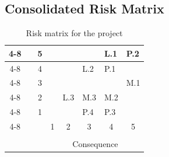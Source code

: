 
%


%
\large
\subsection{Consolidated Risk Matrix}
\begin{table}[H]
    \centering
    \begin{tabular}{ccc|m{0.5cm}|m{0.5cm}|m{0.5cm}|m{0.5cm}|m{0.5cm}|}
        \cline{4-8}
        \cline{4-8}
        \multirow{5}{*}{\rotatebox[origin=c]{90}{Likelihood}} & & 5 & \cellcolor{green!10}&  \cellcolor{yellow!10}& \cellcolor{red!10} & \cellcolor{red!10} L.1 & \cellcolor{red!10} P.2 \\
        \cline{4-8}
        &   &4  & \cellcolor{green!10}   &  \cellcolor{yellow!10}  &  \cellcolor{yellow!10} L.2  &  \cellcolor{red!10} P.1  & \cellcolor{red!10}\\
        \cline{4-8}
        &   & 3 & \cellcolor{green!10} & \cellcolor{yellow!10} & \cellcolor{yellow!10} & \cellcolor{yellow!10} & \cellcolor{red!10} M.1 \\
         \cline{4-8}
        & &2 & \cellcolor{green!10} & \cellcolor{green!10} L.3 & \cellcolor{green!10} M.3 & \cellcolor{yellow!10} M.2 & \cellcolor{yellow!10}\\
         \cline{4-8}
        & & 1& \cellcolor{green!10} & \cellcolor{green!10} & \cellcolor{green!10} P.4 & \cellcolor{green!10} P.3 & \cellcolor{yellow!10}\\
         \cline{4-8}
        & & \multicolumn{1}{c}{} & \multicolumn{1}{c}{1} & \multicolumn{1}{c}{2} & \multicolumn{1}{c}{3} & \multicolumn{1}{c}{4} &\multicolumn{1}{c}{5} \\
         & & \multicolumn{1}{c}{} & \multicolumn{1}{c}{} & \multicolumn{1}{c}{} & \multicolumn{1}{c}{} & \multicolumn{1}{c}{} &\multicolumn{1}{c}{} \\
         & & \multicolumn{1}{c}{} & \multicolumn{5}{c}{Consequence}
    \end{tabular}
     \caption{Risk matrix for the project}
\end{table}

